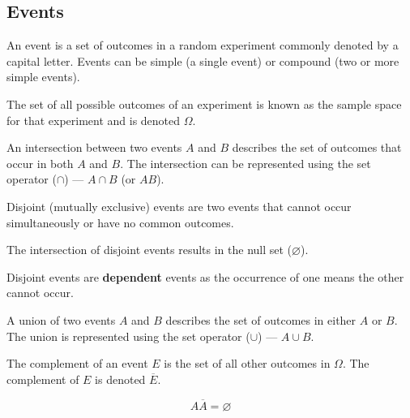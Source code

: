 \documentclass{article}
\begin{document}
\subsection{Events}
\begin{definition}[Event]
    An event is a set of outcomes in a random experiment commonly denoted by a capital letter.
    Events can be simple (a single event) or compound (two or more simple events).
\end{definition}
\begin{definition}
    The set of all possible outcomes of an experiment is known as the sample space
    for that experiment and is denoted \(\Omega\).
\end{definition}
\begin{definition}[Intersection]
    An intersection between two events \(A\) and \(B\) describes the set of outcomes that occur in both \(A\) and \(B\).
    The intersection can be represented using the set {} operator (\(\cap\)) --- \(A \cap B\) (or \(AB\)).
\end{definition}
\begin{definition}[Disjoint]
    Disjoint (mutually exclusive) events are two events that cannot occur simultaneously or have no common outcomes.
\end{definition}
\begin{theorem}
    The intersection of disjoint events results in the null set (\(\varnothing\)).
\end{theorem}
\begin{lemma}
    Disjoint events are \textbf{dependent} events as the occurrence of one means the other cannot occur.
\end{lemma}
\begin{definition}[Union]
    A union of two events \(A\) and \(B\) describes the set of outcomes in either \(A\) or \(B\).
    The union is represented using the set {} operator (\(\cup\)) --- \(A \cup B\).
\end{definition}
\begin{definition}[Complement]
    The complement of an event \(E\) is the set of all other outcomes in \(\Omega\).
    The complement of \(E\) is denoted \(\overline{E}\).
\end{definition}
\begin{theorem}
    \begin{equation*}
        A\overline{A} = \varnothing
    \end{equation*}
\end{theorem}
\end{document}
